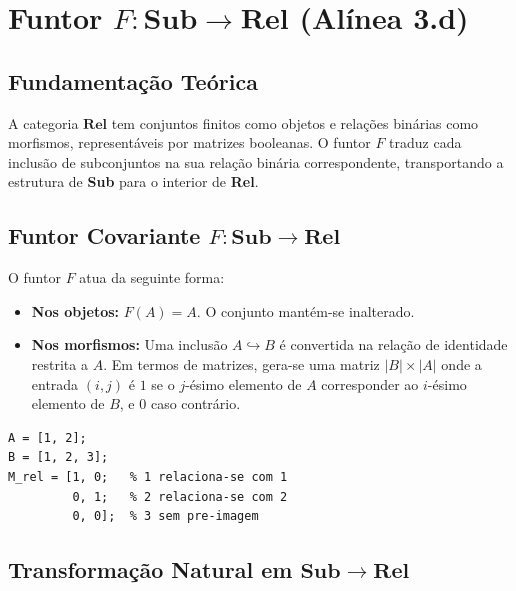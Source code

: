 \section{Funtor $F: \mathbf{Sub} \to \mathbf{Rel}$ (Alínea 3.d)}
\label{sec:functor-sub-rel}

\subsection{Fundamentação Teórica}

A categoria $\mathbf{Rel}$ tem conjuntos finitos como objetos e relações binárias como morfismos, representáveis por matrizes booleanas. O funtor $F$ traduz cada inclusão de subconjuntos na sua relação binária correspondente, transportando a estrutura de \textbf{Sub} para o interior de \textbf{Rel}.

\subsection{Funtor Covariante $F: \mathbf{Sub} \to \mathbf{Rel}$}

\begin{definition}
O funtor $F$ atua da seguinte forma:
\begin{itemize}
    \item \textbf{Nos objetos:} $F(A) = A$. O conjunto mantém-se inalterado.
    \item \textbf{Nos morfismos:} Uma inclusão $A \hookrightarrow B$ é convertida na relação de identidade restrita a $A$. Em termos de matrizes, gera-se uma matriz $|B| \times |A|$ onde a entrada $(i, j)$ é $1$ se o $j$-ésimo elemento de $A$ corresponder ao $i$-ésimo elemento de $B$, e $0$ caso contrário.
\end{itemize}
\end{definition}

\begin{lstlisting}[style=matlab, caption={Funtor $F: \mathbf{Sub} \to \mathbf{Rel}$ em MATLAB}]
A = [1, 2];
B = [1, 2, 3];
M_rel = [1, 0;   % 1 relaciona-se com 1
         0, 1;   % 2 relaciona-se com 2
         0, 0];  % 3 sem pre-imagem
\end{lstlisting}

\subsection{Transformação Natural em $\mathbf{Sub} \to \mathbf{Rel}$}

